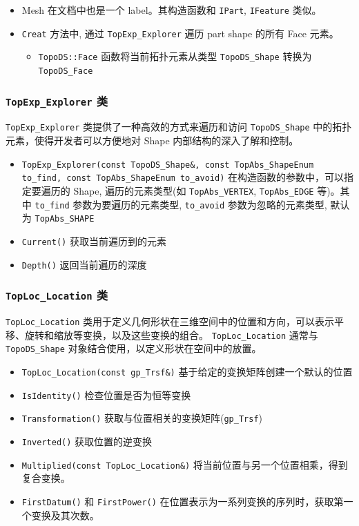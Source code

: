 \documentclass[11pt]{article}
\begin{document}
\begin{itemize}
\item Mesh 在文档中也是一个 label。其构造函数和 \texttt{IPart}, \texttt{IFeature} 类似。
\item \texttt{Creat} 方法中, 通过 \texttt{TopExp\_Explorer} 遍历 part shape 的所有 Face 元素。
\begin{itemize}
\item \texttt{TopoDS::Face} 函数将当前拓扑元素从类型 \texttt{TopoDS\_Shape} 转换为 \texttt{TopoDS\_Face}
\end{itemize}
\end{itemize}
\subsubsection{\texttt{TopExp\_Explorer} 类}
\label{sec:org3d382f8}

\texttt{TopExp\_Explorer} 类提供了一种高效的方式来遍历和访问 \texttt{TopoDS\_Shape} 中的拓扑元素，使得开发者可以方便地对 Shape 内部结构的深入了解和控制。

\begin{itemize}
\item \texttt{TopExp\_Explorer(const TopoDS\_Shape\&, const TopAbs\_ShapeEnum to\_find, const TopAbs\_ShapeEnum to\_avoid)} 在构造函数的参数中，可以指定要遍历的 Shape, 遍历的元素类型(如 \texttt{TopAbs\_VERTEX}, \texttt{TopAbs\_EDGE} 等)。其中 \texttt{to\_find} 参数为要遍历的元素类型, \texttt{to\_avoid} 参数为忽略的元素类型, 默认为 \texttt{TopAbs\_SHAPE}
\item \texttt{Current()} 获取当前遍历到的元素
\item \texttt{Depth()} 返回当前遍历的深度
\end{itemize}
\subsubsection{\texttt{TopLoc\_Location} 类}
\label{sec:org62568df}

\texttt{TopLoc\_Location} 类用于定义几何形状在三维空间中的位置和方向，可以表示平移、旋转和缩放等变换，以及这些变换的组合。 \texttt{TopLoc\_Location} 通常与 \texttt{TopoDS\_Shape} 对象结合使用，以定义形状在空间中的放置。

\begin{itemize}
\item \texttt{TopLoc\_Location(const gp\_Trsf\&)} 基于给定的变换矩阵创建一个默认的位置
\item \texttt{IsIdentity()} 检查位置是否为恒等变换
\item \texttt{Transformation()} 获取与位置相关的变换矩阵(\texttt{gp\_Trsf})
\item \texttt{Inverted()} 获取位置的逆变换
\item \texttt{Multiplied(const TopLoc\_Location\&)} 将当前位置与另一个位置相乘，得到复合变换。
\item \texttt{FirstDatum()} 和 \texttt{FirstPower()} 在位置表示为一系列变换的序列时，获取第一个变换及其次数。
\end{itemize}
\end{document}
